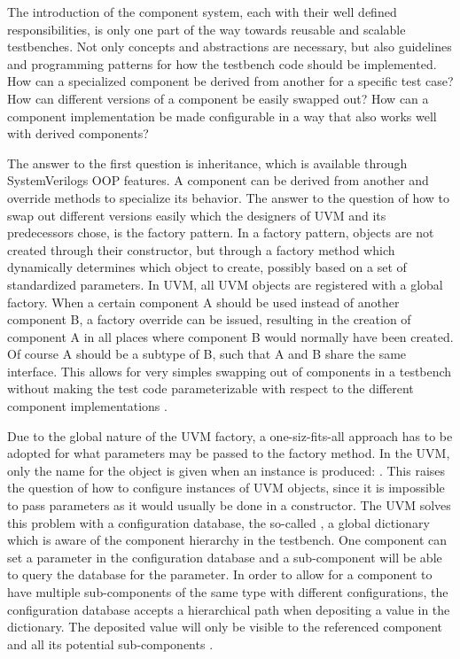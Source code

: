 The introduction of the component system, each with their well defined responsibilities, is only one part of the way
towards reusable and scalable testbenches. Not only concepts and abstractions are necessary, but also guidelines and
programming patterns for how the testbench code should be implemented. How can a specialized component be derived
from another for a specific test case? How can different versions of a component be easily swapped out? How can a
component implementation be made configurable in a way that also works well with derived components?

The answer to the first question is inheritance, which is available through SystemVerilogs OOP features. A component
can be derived from another and override methods to specialize its behavior. The answer to the question of how to
swap out different versions easily which the designers of UVM and its predecessors chose, is the factory pattern. In
a factory pattern, objects are not created through their constructor, but through a factory method which dynamically
determines which object to create, possibly based on a set of standardized parameters. In UVM, all UVM objects are
registered with a global factory. When a certain component A should be used instead of another component B, a factory
override can be issued, resulting in the creation of component A in all places where component B would normally have
been created. Of course A should be a subtype of B, such that A and B share the same interface. This allows for very
simples swapping out of components in a testbench without making the test code parameterizable with respect to the
different component implementations \cite[Ch. 13]{salemi2013uvm}.

Due to the global nature of the UVM factory, a one-siz-fits-all approach has to be adopted for what parameters may be
passed to the factory method. In the UVM, only the name for the object is given when an instance is produced:
. This raises the question of how to configure instances of UVM objects,
since it is impossible to pass parameters as it would usually be done in a constructor. The UVM solves this problem
with a configuration database, the so-called , a global dictionary which is aware of the
component hierarchy in the testbench. One component can set a parameter in the configuration database and a
sub-component will be able to query the database for the parameter. In order to allow for a component to have
multiple sub-components of the same type with different configurations, the configuration database accepts a
hierarchical path when depositing a value in the dictionary. The deposited value will only be visible to the
referenced component and all its potential sub-components \cite{configdb}.

